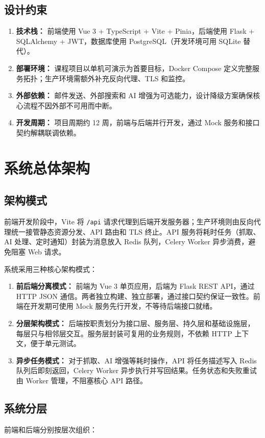 \documentclass[12pt,a4paper]{ctexart}
\begin{document}
\subsection{设计约束}
\begin{enumerate}
\item \textbf{技术栈：} 前端使用 Vue 3 + TypeScript + Vite + Pinia，后端使用 Flask + SQLAlchemy + JWT，数据库使用 PostgreSQL（开发环境可用 SQLite 替代）。
\item \textbf{部署环境：} 课程项目以单机可演示为首要目标，Docker Compose 定义完整服务拓扑；生产环境需额外补充反向代理、TLS 和监控。
\item \textbf{外部依赖：} 邮件发送、外部搜索和 AI 增强为可选能力，设计降级方案确保核心流程不因外部不可用而中断。
\item \textbf{开发周期：} 项目周期约 12 周，前端与后端并行开发，通过 Mock 服务和接口契约解耦联调依赖。
\end{enumerate}

\section{系统总体架构}
\subsection{架构模式}
前端开发阶段中，Vite 将 \texttt{/api} 请求代理到后端开发服务器；生产环境则由反向代理统一接管静态资源分发、API 路由和 TLS 终止。API 服务将耗时任务（抓取、AI 处理、定时通知）封装为消息放入 Redis 队列，Celery Worker 异步消费，避免阻塞 Web 请求。

系统采用三种核心架构模式：
\begin{enumerate}
\item \textbf{前后端分离模式：} 前端为 Vue 3 单页应用，后端为 Flask REST API，通过 HTTP JSON 通信。两者独立构建、独立部署，通过接口契约保证一致性。前端在开发期可使用 Mock 服务先行开发，不等待后端接口就绪。
\item \textbf{分层架构模式：} 后端按职责划分为接口层、服务层、持久层和基础设施层，每层只与相邻层交互。服务层封装可复用的业务规则，不依赖 HTTP 上下文，便于单元测试。
\item \textbf{异步任务模式：} 对于抓取、AI 增强等耗时操作，API 将任务描述写入 Redis 队列后即刻返回，Celery Worker 异步执行并写回结果。任务状态和失败重试由 Worker 管理，不阻塞核心 API 路径。
\end{enumerate}

\subsection{系统分层}
前端和后端分别按层次组织：
\end{document}
